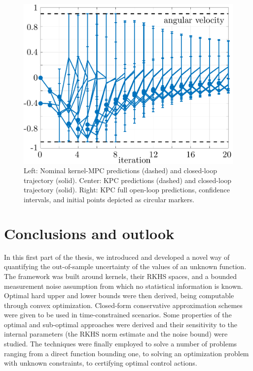 \begin{figure}[t]
	\includegraphics[scale=0.25]{../images/chap2_numex_ex4_C.pdf}
	\caption{Left: Nominal kernel-MPC predictions (dashed) and closed-loop trajectory (solid). Center: KPC predictions (dashed) and closed-loop trajectory (solid). Right: KPC full open-loop predictions, confidence intervals, and initial points depicted as circular markers. %
	}
	\label{fig.PENDULUM}
\end{figure}
	

\section{Conclusions and outlook}

In this first part of the thesis, we introduced and developed a novel way of quantifying the out-of-sample uncertainty of the values of an unknown function. The framework was built around kernels, their RKHS spaces, and a bounded measurement noise assumption from which no statistical information is known. Optimal hard upper and lower bounds were then derived, being computable through convex optimization. Closed-form conservative approximation schemes were given to be used in time-constrained scenarios. Some properties of the optimal and sub-optimal approaches were derived and their sensitivity to the internal parameters (the RKHS norm estimate and the noise bound) were studied. The techniques were finally employed to solve a number of problems ranging from a direct function bounding one, to solving an optimization problem with unknown constraints, to certifying optimal control actions.

